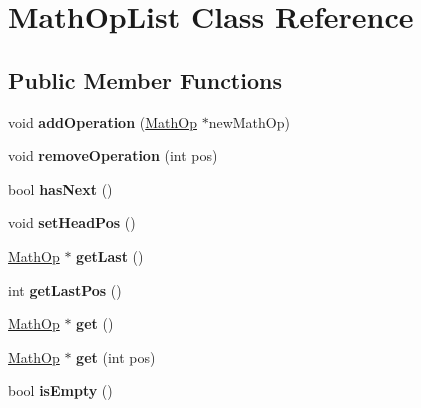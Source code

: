 \hypertarget{class_math_op_list}{}\section{Math\+Op\+List Class Reference}
\label{class_math_op_list}
\subsection*{Public Member Functions}
\begin{DoxyCompactItemize}
\item 
\hypertarget{class_math_op_list_a5316d3bc11507fbb0c1accc8f50ef44b}{}void {\bfseries add\+Operation} (\hyperlink{class_math_op}{Math\+Op} $\ast$new\+Math\+Op)\label{class_math_op_list_a5316d3bc11507fbb0c1accc8f50ef44b}

\item 
\hypertarget{class_math_op_list_a8a8912d6b56b82ce57c2f8438ffcf1c3}{}void {\bfseries remove\+Operation} (int pos)\label{class_math_op_list_a8a8912d6b56b82ce57c2f8438ffcf1c3}

\item 
\hypertarget{class_math_op_list_a03cb8ae4c430d44ad0da52f92e08dce9}{}bool {\bfseries has\+Next} ()\label{class_math_op_list_a03cb8ae4c430d44ad0da52f92e08dce9}

\item 
\hypertarget{class_math_op_list_aea70a75d82a00034f5f2fb2aa5b16b22}{}void {\bfseries set\+Head\+Pos} ()\label{class_math_op_list_aea70a75d82a00034f5f2fb2aa5b16b22}

\item 
\hypertarget{class_math_op_list_a20880de2f17a1f883b5254603325e38f}{}\hyperlink{class_math_op}{Math\+Op} $\ast$ {\bfseries get\+Last} ()\label{class_math_op_list_a20880de2f17a1f883b5254603325e38f}

\item 
\hypertarget{class_math_op_list_ad062e78175b80791fa07ee08f4dbe0d5}{}int {\bfseries get\+Last\+Pos} ()\label{class_math_op_list_ad062e78175b80791fa07ee08f4dbe0d5}

\item 
\hypertarget{class_math_op_list_a57a567366dd8f83779d6040c9fb017c4}{}\hyperlink{class_math_op}{Math\+Op} $\ast$ {\bfseries get} ()\label{class_math_op_list_a57a567366dd8f83779d6040c9fb017c4}

\item 
\hypertarget{class_math_op_list_a4c6555e072ee3280f8d7fd93551f4513}{}\hyperlink{class_math_op}{Math\+Op} $\ast$ {\bfseries get} (int pos)\label{class_math_op_list_a4c6555e072ee3280f8d7fd93551f4513}

\item 
\hypertarget{class_math_op_list_a18e3ee1871a887d1428072f98f1c5cbd}{}bool {\bfseries is\+Empty} ()\label{class_math_op_list_a18e3ee1871a887d1428072f98f1c5cbd}

\end{DoxyCompactItemize}
